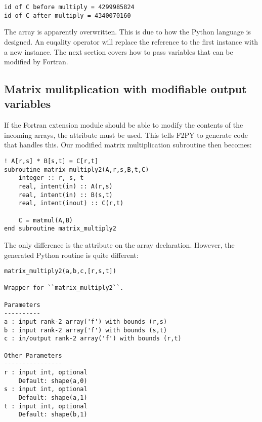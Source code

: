 \cmdmode

\begin{lstlisting}
id of C before multiply = 4299985824
id of C after multiply = 4340070160
\end{lstlisting}

The  array is apparently overwritten. This is due to how the Python language is designed. An euqality operator will replace the reference to the first  instance with a new instance. The next section covers how to pass variables that can be modified by Fortran.

\subsection{Matrix mulitplication with modifiable output variables}

If the Fortran extension module should be able to modify the contents of the incoming arrays, the  attribute must be used. This tells F2PY to generate code that handles this. Our modified matrix multiplication subroutine then becomes:

\fmode

\begin{lstlisting}
! A[r,s] * B[s,t] = C[r,t]
subroutine matrix_multiply2(A,r,s,B,t,C)
	integer :: r, s, t
	real, intent(in) :: A(r,s)
	real, intent(in) :: B(s,t)
	real, intent(inout) :: C(r,t)

	C = matmul(A,B)
end subroutine matrix_multiply2
\end{lstlisting}

The only difference is the  attribute on the  array declaration. However, the generated Python routine is quite different:

\cmdmode

\begin{lstlisting}
matrix_multiply2(a,b,c,[r,s,t])

Wrapper for ``matrix_multiply2``.

Parameters
----------
a : input rank-2 array('f') with bounds (r,s)
b : input rank-2 array('f') with bounds (s,t)
c : in/output rank-2 array('f') with bounds (r,t)

Other Parameters
----------------
r : input int, optional
    Default: shape(a,0)
s : input int, optional
    Default: shape(a,1)
t : input int, optional
    Default: shape(b,1)
\end{lstlisting}

